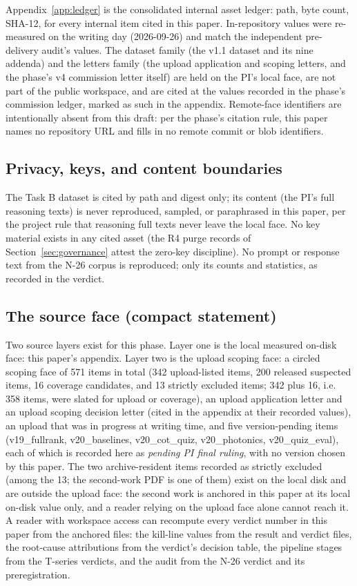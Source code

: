 \documentclass[11pt]{article}
\begin{document}
Appendix~\ref{app:ledger} is the consolidated internal asset ledger: path, byte count, SHA-12, for every internal item cited in this paper. In-repository values were re-measured on the writing day (2026-09-26) and match the independent pre-delivery audit's values. The dataset family (the v1.1 dataset and its nine addenda) and the letters family (the upload application and scoping letters, and the phase's v4 commission letter itself) are held on the PI's local face, are not part of the public workspace, and are cited at the values recorded in the phase's commission ledger, marked as such in the appendix. Remote-face identifiers are intentionally absent from this draft: per the phase's citation rule, this paper names no repository URL and fills in no remote commit or blob identifiers.

\subsection{Privacy, keys, and content boundaries}

The Task B dataset is cited by path and digest only; its content (the PI's full reasoning texts) is never reproduced, sampled, or paraphrased in this paper, per the project rule that reasoning full texts never leave the local face. No key material exists in any cited asset (the R4 purge records of Section~\ref{sec:governance} attest the zero-key discipline). No prompt or response text from the N-26 corpus is reproduced; only its counts and statistics, as recorded in the verdict.

\subsection{The source face (compact statement)}

Two source layers exist for this phase. Layer one is the local measured on-disk face: this paper's appendix. Layer two is the upload scoping face: a circled scoping face of 571 items in total (342 upload-listed items, 200 released suspected items, 16 coverage candidates, and 13 strictly excluded items; 342 plus 16, i.e. 358 items, were slated for upload or coverage), an upload application letter and an upload scoping decision letter (cited in the appendix at their recorded values), an upload that was in progress at writing time, and five version-pending items (v19\_fullrank, v20\_baselines, v20\_cot\_quiz, v20\_photonics, v20\_quiz\_eval), each of which is recorded here as \emph{pending PI final ruling}, with no version chosen by this paper. The two archive-resident items recorded as strictly excluded (among the 13; the second-work PDF is one of them) exist on the local disk and are outside the upload face: the second work is anchored in this paper at its local on-disk value only, and a reader relying on the upload face alone cannot reach it. A reader with workspace access can recompute every verdict number in this paper from the anchored files: the kill-line values from the result and verdict files, the root-cause attributions from the verdict's decision table, the pipeline stages from the T-series verdicts, and the audit from the N-26 verdict and its preregistration.
\end{document}
